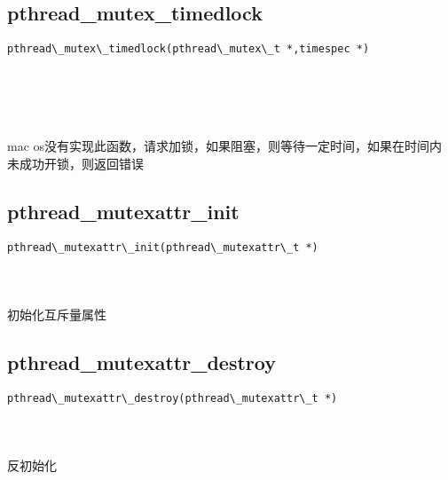 \documentclass[10pt,a4paper]{article}
\begin{document}
\subsection{pthread\_mutex\_timedlock}
\begin{spacing}{2.0}
\lstset{language=C,numbers=none}
\begin{lstlisting}
pthread\_mutex\_timedlock(pthread\_mutex\_t *,timespec *)
\end{lstlisting}
{\large\color[rgb]{0.2,0.4,0.6}{*:}} \\
{\large\color[rgb]{0.2,0.4,0.6}{*:}}
\paragraph{ \ \ }mac os没有实现此函数，请求加锁，如果阻塞，则等待一定时间，如果在时间内未成功开锁，则返回错误
\end{spacing}

\subsection{pthread\_mutexattr\_init}
\begin{spacing}{2.0}
\lstset{language=C,numbers=none}
\begin{lstlisting}
pthread\_mutexattr\_init(pthread\_mutexattr\_t *)
\end{lstlisting}
{\large\color[rgb]{0.2,0.4,0.6}{*:}}
\paragraph{ \ \ }初始化互斥量属性
\end{spacing}

\subsection{pthread\_mutexattr\_destroy}
\begin{spacing}{2.0}
\lstset{language=C,numbers=none}
\begin{lstlisting}
pthread\_mutexattr\_destroy(pthread\_mutexattr\_t *)
\end{lstlisting}
{\large\color[rgb]{0.2,0.4,0.6}{*:}}
\paragraph{ \ \ }反初始化
\end{spacing}
\end{document}
